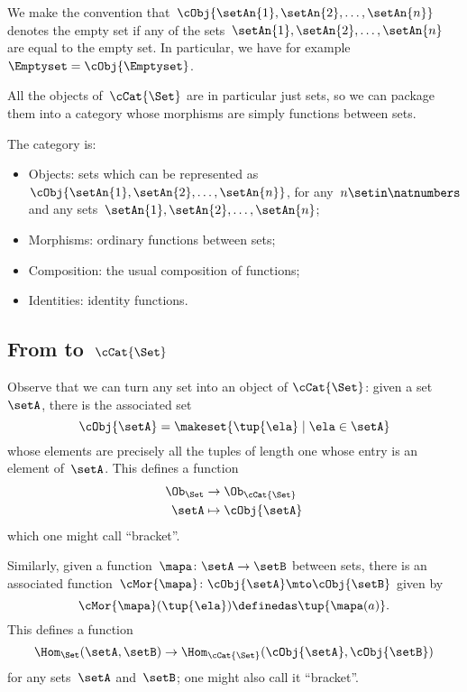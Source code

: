 We make the convention that~$\cObj{\setAn{1}, \setAn{2}, \ldots, \setAn{n}}$ denotes the empty set if any of the sets~$\setAn{1}, \setAn{2}, \ldots , \setAn{n}$ are equal to the empty set.
In particular, we have for example~$\Emptyset = \cObj{\Emptyset}$.

All the objects of~$\cCat{\Set}$ are in particular just sets, so we can package them into a category whose morphisms are simply functions between sets.

\begin{ctdefinition}[\cCat{\Set}]
    The category \cCat{\Set} is:
    \begin{itemize}
        \item Objects: sets which can be represented as~$\cObj{\setAn{1}, \setAn{2}, \ldots, \setAn{n}}$, for any~$n \setin \natnumbers$ and any sets~$\setAn{1}, \setAn{2}, \ldots, \setAn{n}$;
        \item Morphisms: ordinary functions between sets;
        \item Composition: the usual composition of functions;
        \item Identities: identity functions.
    \end{itemize}
\end{ctdefinition}

\subsection{From \Set to~$\cCat{\Set}$}

Observe that we can turn any set into an object of $\cCat{\Set}$: given a set~$\setA$, there is the associated set
\begin{equation*}
    \cObj{\setA} = \makeset{ \tup{\ela} \mid \ela \in \setA }
\end{equation*}
whose elements are precisely all the tuples of length one whose entry is an element of~$\setA$.
This defines a function
\begin{equation*}
    \begin{aligned}
        \Ob_{\Set} & \to \Ob_{\cCat{\Set}} \\
        \setA      & \mapsto \cObj{\setA}
    \end{aligned}
\end{equation*}
which one might call ``bracket''.

Similarly, given a function~$\mapa \colon \setA \to \setB$ between sets, there is an associated function~$\cMor{ \mapa }\colon \cObj{\setA} \mto \cObj{\setB}$ given by
\begin{equation*}
    \cMor{ \mapa } ( \tup{ \ela }) \definedas \tup{\mapa(a)}.
\end{equation*}
This defines a function
\begin{equation*}
    \Hom_{\Set}(\setA,\setB) \to \Hom_{\cCat{\Set}}(\cObj{\setA},\cObj{\setB})
\end{equation*}
for any sets~$\setA$ and~$\setB$; one might also call it ``bracket''.

